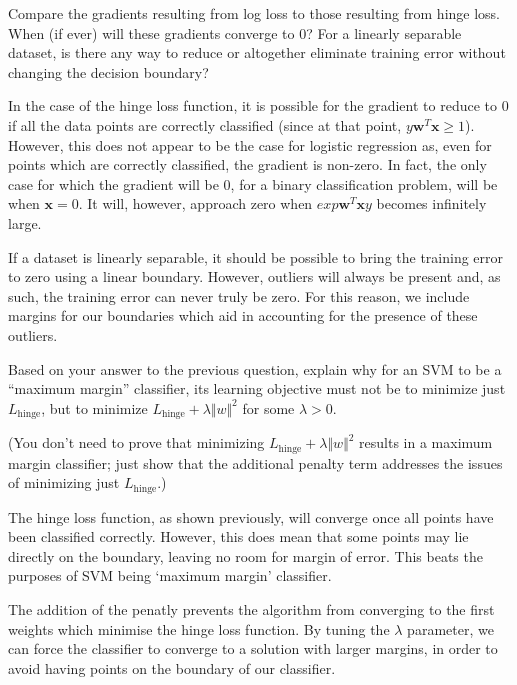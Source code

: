 \problem[4]
Compare the gradients resulting from log loss to those resulting from hinge loss. When (if ever) will these gradients converge to 0? For a linearly separable dataset, is there any way to reduce or altogether eliminate training error without changing the decision boundary?

\begin{solution}
 In the case of the hinge loss function, it is possible for the gradient to reduce to 0 if all the data points are correctly classified (since at that point, $y\mathbf{w}^T\mathbf{x}\geq 1$). However, this does not appear to be the case for logistic regression as, even for points which are correctly classified, the gradient is non-zero. In fact, the only case for which the gradient will be 0, for a binary classification problem, will be when $\mathbf{x}=0$. It will, however, approach zero when $exp{\mathbf{w}^T\mathbf{x}y}$ becomes infinitely large. 

 If a dataset is linearly separable, it should be possible to bring the training error to zero using a linear boundary. However, outliers will always be present and, as such, the training error can never truly be zero. For this reason, we include margins for our boundaries which aid in accounting for the presence of these outliers.
\end{solution}

\problem[5]
Based on your answer to the previous question, explain why for an SVM to be a ``maximum margin'' classifier, its learning objective must not be to minimize just $L_\text{hinge}$, but to minimize $L_\text{hinge} + \lambda\Vert w \Vert^2$ for some $\lambda > 0$.

(You don't need to prove that minimizing $L_\text{hinge} + \lambda\Vert w \Vert^2$ results in a maximum margin classifier; just show that the additional penalty term addresses the issues of minimizing just $L_\text{hinge}$.)

\begin{solution}
 The hinge loss function, as shown previously, will converge once all points have been classified correctly. However, this does mean that some points may lie directly on the boundary, leaving no room for margin of error. This beats the purposes of SVM being `maximum margin' classifier. 

 The addition of the penatly prevents the algorithm from converging to the first weights which minimise the hinge loss function. By tuning the $\lambda$ parameter, we can force the classifier to converge to a solution with larger margins, in order to avoid having points on the boundary of our classifier.
\end{solution}

